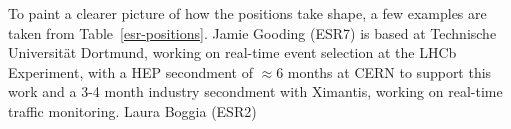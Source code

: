 To paint a clearer picture of how the positions take shape, a few examples are taken from Table~\ref{esr-positions}. Jamie Gooding (ESR7) is based at Technische Universität Dortmund, working on real-time event selection at the LHCb Experiment, with a HEP secondment of $\approx 6$ months at CERN to support this work and a 3-4 month industry secondment with Ximantis, working on real-time traffic monitoring. Laura Boggia (ESR2)  \par